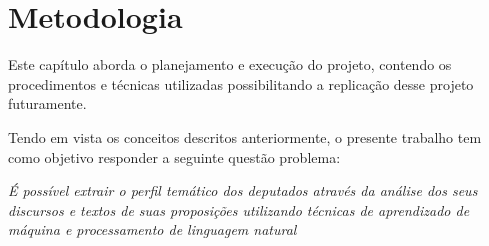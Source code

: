 \chapter{Metodologia}

Este capítulo aborda o planejamento e execução do projeto, contendo os procedimentos e técnicas utilizadas possibilitando a replicação desse projeto futuramente.

Tendo em vista os conceitos descritos anteriormente, o presente trabalho tem como objetivo responder a seguinte questão problema:

\begin{center}
\textit{É possível extrair o perfil temático dos deputados através da análise dos seus discursos e textos de suas proposições utilizando técnicas de aprendizado de máquina e processamento de linguagem natural}
\end{center}

